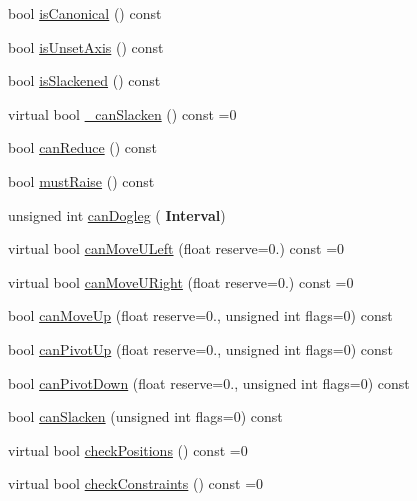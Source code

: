 \begin{DoxyCompactItemize}
bool \mbox{\hyperlink{classKatabatic_1_1AutoSegment_af6d3008d345195a99e0341f0379c33b7}{is\+Canonical}} () const
\item 
bool \mbox{\hyperlink{classKatabatic_1_1AutoSegment_a2bd22f431b7cf3695babab78fc3b4c9e}{is\+Unset\+Axis}} () const
\item 
bool \mbox{\hyperlink{classKatabatic_1_1AutoSegment_a782cff57d3fe10e758d19ee65a06643d}{is\+Slackened}} () const
\item 
virtual bool \mbox{\hyperlink{classKatabatic_1_1AutoSegment_a676fcb7ece71d129b7a4d87a3f2e07aa}{\+\_\+can\+Slacken}} () const =0
\item 
bool \mbox{\hyperlink{classKatabatic_1_1AutoSegment_af1a231b2324a486d4ef61b247886cdeb}{can\+Reduce}} () const
\item 
bool \mbox{\hyperlink{classKatabatic_1_1AutoSegment_a449ebb156fd51b04bbc029a657b4cded}{must\+Raise}} () const
\item 
unsigned int \mbox{\hyperlink{classKatabatic_1_1AutoSegment_a43c865bcfcfd6132352a9ac8a84c25cd}{can\+Dogleg}} (\textbf{ Interval})
\item 
virtual bool \mbox{\hyperlink{classKatabatic_1_1AutoSegment_aad55626c9d793a0b08bcff5be2a5ad0c}{can\+Move\+U\+Left}} (float reserve=0.) const =0
\item 
virtual bool \mbox{\hyperlink{classKatabatic_1_1AutoSegment_a096deb8a143f098eac2bff9ab9c52243}{can\+Move\+U\+Right}} (float reserve=0.) const =0
\item 
bool \mbox{\hyperlink{classKatabatic_1_1AutoSegment_a6482341a342eb6e6b3b43f13fd4436f6}{can\+Move\+Up}} (float reserve=0., unsigned int flags=0) const
\item 
bool \mbox{\hyperlink{classKatabatic_1_1AutoSegment_a6cca3afced729492cae6649a92dc7e88}{can\+Pivot\+Up}} (float reserve=0., unsigned int flags=0) const
\item 
bool \mbox{\hyperlink{classKatabatic_1_1AutoSegment_a24de580d1a371b8d27640cbc3431990b}{can\+Pivot\+Down}} (float reserve=0., unsigned int flags=0) const
\item 
bool \mbox{\hyperlink{classKatabatic_1_1AutoSegment_adec088de3c4c47a28ee9d58eb6d9cf85}{can\+Slacken}} (unsigned int flags=0) const
\item 
virtual bool \mbox{\hyperlink{classKatabatic_1_1AutoSegment_af026a81002bd907f1ccd4a4784aaa1db}{check\+Positions}} () const =0
\item 
virtual bool \mbox{\hyperlink{classKatabatic_1_1AutoSegment_a3d5732fd10b4a05076981066a4674487}{check\+Constraints}} () const =0

\end{DoxyCompactItemize}
